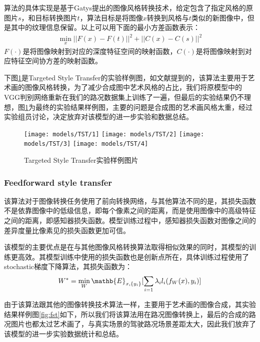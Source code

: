 算法的具体实现是基于Gatys提出的图像风格转换技术\cite{nst}，给定包含了指定风格的原图片$s$，和目标转换图片$t$，算法目标是将图像$x$转换到风格与$t$类似的新图像中，但是其中的纹理信息保留。以上可以用下面的最小方差函数表示：
\begin{align}
    \min_x ||F(x)-F(t)||^2+||C(x)-C(s)||^2
\end{align}
$F(\cdot)$是将图像映射到对应的深度特征空间的映射函数，$C(\cdot)$是将图像映射到对应特征空间协方差的映射函数。

下图\ref{fig:tst}是Targeted Style Transfer的实验样例图，如文献\cite{Targeted-Style-Transfer}提到的，该算法主要用于艺术画的图像风格转换，为了减少合成图中艺术风格的占比，我们将原模型中的VGG判别网络重新在我们的路况数据集上训练了一遍，但最后的实验结果仍不理想，图\ref{fig:tst}为最终的实验结果样例图，主要的问题是合成图的艺术画风格太重，经过实验组员讨论，决定放弃对该模型的进一步实验和数据总结。

\begin{figure}[h]
    \centering
    \texttt{[image: models/TST/1]}
    \texttt{[image: models/TST/2]}
    \texttt{[image: models/TST/3]}
    \texttt{[image: models/TST/4]}
    \caption{Targeted Style Transfer实验样例图片}
    \label{fig:tst}
\end{figure}

\subsubsection{Feedforward style transfer}

 该算法对于图像转换任务使用了前向转换网络，与其他算法不同的是，其损失函数不是依靠图像中的低级信息，即每个像素之间的距离，而是使用图像中的高级特征之间的距离，即感知器损失函数。模型训练过程中，感知器损失函数对图像之间的差异度量比像素见的损失函数更加可信。

该模型的主要优点是在与其他图像风格转换算法取得相似效果的同时，其模型的训练更高效。其模型训练中使用的损失函数也是创新点所在，具体训练过程使用了stochastic梯度下降算法，其损失函数为：
\begin{align}
    W^*=\min_W\mathb{E}_{x,\{y_i\}}[\sum_{i=1}\lambda_il_i(f_W(x),y_i)]
\end{align}

由于该算法跟其他的图像转换技术算法一样，主要用于艺术画的图像合成，其实验结果样例图\ref{fig:fst}如下，所以我们将该算法用在路况图像转换上，最后的合成的路况图片也都太过艺术画了，与真实场景的驾驶路况场景差距太大，因此我们放弃了该模型的进一步实验数据统计和总结。 

